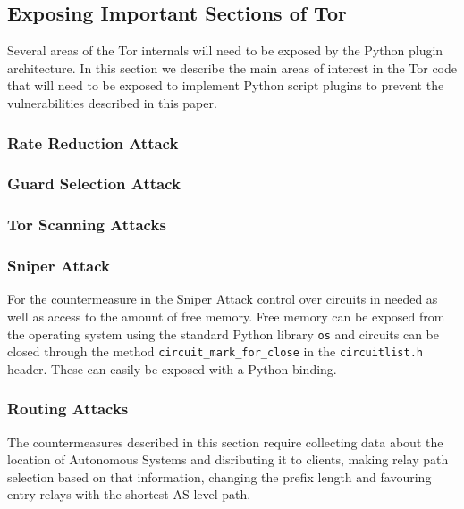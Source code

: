 \documentclass[9pt,technote]{IEEEtran}
\begin{document}
\subsection{Exposing Important Sections of Tor}
Several areas of the Tor internals will need to be exposed by the Python plugin
architecture. In this section we describe the main areas of interest in the Tor
code that will need to be exposed to implement Python script plugins to prevent
the vulnerabilities described in this paper.
\subsubsection{Rate Reduction Attack}
\subsubsection{Guard Selection Attack}
\subsubsection{Tor Scanning Attacks}
\subsubsection{Sniper Attack}
For the countermeasure in the Sniper Attack control over circuits in needed as
well as access to the amount of free memory. Free memory can be exposed from the
operating system using the standard Python library \texttt{os} and circuits can
be closed through the method \texttt{circuit\_mark\_for\_close} in the
\texttt{circuitlist.h} header. These can easily be exposed with a Python
binding.
\subsubsection{Routing Attacks}
The countermeasures described in this section require collecting data about the
location of Autonomous Systems and disributing it to clients, making relay path
selection based on that information, changing the prefix length and favouring
entry relays with the shortest AS-level path.



\end{document}
